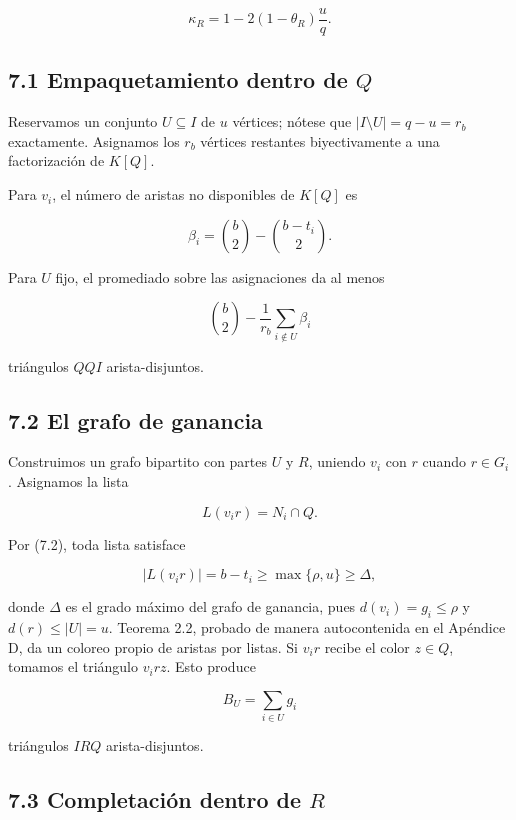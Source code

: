 \documentclass[
  11pt,
]{article}
\begin{document}
\[
\kappa_R
=
1-2(1-\theta_R)\frac{u}{q}.
\tag{7.3}
\]

\subsection{\texorpdfstring{7.1 Empaquetamiento dentro de \(Q\)}{7.1 Empaquetamiento dentro de Q}}\label{empaquetamiento-dentro-de-q}

Reservamos un conjunto \(U\subseteq I\) de \(u\) vértices; nótese que \(|I\setminus U|=q-u=r_b\) exactamente. Asignamos los \(r_b\) vértices restantes biyectivamente a una factorización de \(K[Q]\).

Para \(v_i\), el número de aristas no disponibles de \(K[Q]\) es

\[
\beta_i
=
\binom b2-\binom{b-t_i}{2}.
\tag{7.4}
\]

Para \(U\) fijo, el promediado sobre las asignaciones da al menos

\[
\binom b2-\frac1{r_b}\sum_{i\notin U}\beta_i
\tag{7.5}
\]

triángulos \(QQI\) arista-disjuntos.

\subsection{7.2 El grafo de ganancia}\label{el-grafo-de-ganancia}

Construimos un grafo bipartito con partes \(U\) y \(R\), uniendo \(v_i\) con \(r\) cuando \(r\in G_i\). Asignamos la lista

\[
L(v_ir)=N_i\cap Q.
\]

Por (7.2), toda lista satisface

\[
|L(v_ir)|=b-t_i
\ge
\max\{\rho,u\}
\ge
\Delta,
\]

donde \(\Delta\) es el grado máximo del grafo de ganancia, pues \(d(v_i)=g_i\le\rho\) y \(d(r)\le|U|=u\). Teorema 2.2, probado de manera autocontenida en el Apéndice D, da un coloreo propio de aristas por listas. Si \(v_ir\) recibe el color \(z\in Q\), tomamos el triángulo \(v_irz\). Esto produce

\[
B_U=\sum_{i\in U}g_i
\]

triángulos \(IRQ\) arista-disjuntos.

\subsection{\texorpdfstring{7.3 Completación dentro de \(R\)}{7.3 Completación dentro de R}}\label{completaciuxf3n-dentro-de-r}
\end{document}

